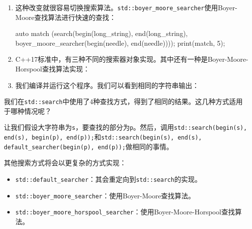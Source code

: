 \begin{enumerate}
\item 这种改变就很容易切换搜索算法。\texttt{std::boyer\_moore\_searcher}使用Boyer-Moore查找算法进行快速的查找：

\begin{codebox}[cpp]
{
    auto match (search(begin(long_string), end(long_string),
        boyer_moore_searcher(begin(needle), end(needle))));
    print(match, 5);
}   
\end{codebox}

\item C++17标准中，有三种不同的搜索器对象实现。其中还有一种是Boyer-Moore-Horspool查找算法实现：

\begin{codebox}[cpp]
    {
        auto match (search(begin(long_string), end(long_string),
            boyer_moore_horspool_searcher(begin(needle),
            end(needle))));
        print(match, 5);
    }
}
\end{codebox}

\item 我们编译并运行这个程序。我们可以看到相同的字符串输出：


\end{enumerate}


我们在\texttt{std::search}中使用了4种查找方式，得到了相同的结果。这几种方式适用于哪种情况呢？

让我们假设大字符串为\texttt{s}，要查找的部分为\texttt{p}。然后，调用\texttt{std::search(begin(s), end(s), begin(p), end(p));}和\texttt{std::search(begin(s), end(s), default\_searcher(begin(p), end(p));}做相同的事情。

其他搜索方式将会以更复杂的方式实现：

\begin{itemize}
\item \texttt{std::default\_searcher}：其会重定向到\texttt{std::search}的实现。

\item \texttt{std::boyer\_moore\_searcher}：使用Boyer-Moore查找算法。

\item \texttt{std::boyer\_moore\_horspool\_searcher}：使用Boyer-Moore-Horspool查找算法。

\end{itemize}

